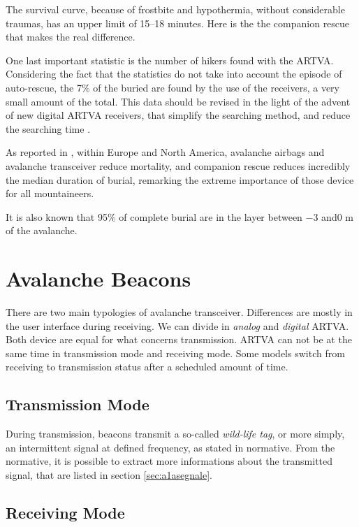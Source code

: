 The survival curve, because of frostbite and hypothermia, without considerable traumas, has an upper limit of 15--18 minutes. Here is the the companion rescue that makes the real difference\cite{ManualeSciAlpinismo}.

One last important statistic is the number of hikers found with the ARTVA. Considering the fact that the statistics do not take into account the episode of auto-rescue, the 7\% of the buried are found by the use of the receivers, a very small amount of the total. This data should be revised in the light of the advent of new digital ARTVA receivers, that simplify the searching method, and reduce the searching time \citep{hereforddigital}. 

As reported in \citep{Brugger2007}, within Europe and North America, avalanche airbags and avalanche transceiver reduce mortality, and companion rescue reduces incredibly the median duration of burial, remarking the extreme importance of those device for all mountaineers.

It is also known that 95\% of complete burial are in the layer between \num{-3} and\num{0} \si{\meter} of the avalanche.

\section{Avalanche Beacons}

There are two main typologies of avalanche transceiver. Differences are mostly in the user interface during receiving. We can divide in \emph{analog} and \emph{digital} ARTVA. Both device are equal for what concerns transmission. ARTVA can not be at the same time in transmission mode and receiving mode. Some models switch from receiving to transmission status after a scheduled amount of time. 

\subsection{Transmission Mode}

During transmission, beacons transmit a so-called \emph{wild-life tag}, or more simply, an intermittent signal at defined frequency, as stated in normative\cite{NormativaARVA}. From the normative, it is possible to extract more informations about the transmitted signal, that are listed in section \ref{sec:a1asegnale}.

\subsection{Receiving Mode}

